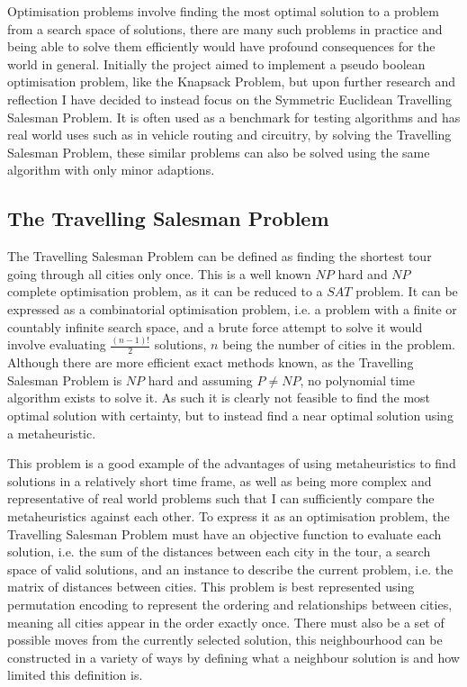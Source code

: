 \documentclass[]{final_report}
\begin{document}
Optimisation problems involve finding the most optimal solution to a problem from a search space of solutions, there are many such problems in practice and being able to solve them efficiently would have profound consequences for the world in general. Initially the project aimed to implement a pseudo boolean optimisation problem, like the Knapsack Problem, but upon further research and reflection I have decided to instead focus on the Symmetric Euclidean Travelling Salesman Problem. It is often used as a benchmark for testing algorithms and has real world uses such as in vehicle routing and circuitry, by solving the Travelling Salesman Problem, these similar problems can also be solved using the same algorithm with only minor adaptions.

\subsection*{The Travelling Salesman Problem}

The Travelling Salesman Problem can be defined as finding the shortest tour going through all cities only once. This is a well known $NP$ hard and $NP$ complete optimisation problem, as it can be reduced to a $SAT$ problem\cite{barak:2007}. It can be expressed as a combinatorial optimisation problem, i.e. a problem with a finite or countably infinite search space, and a brute force attempt to solve it would involve evaluating $\frac{(n - 1)!}{2}$ solutions, $n$ being the number of cities in the problem. Although there are more efficient exact methods known, as the Travelling Salesman Problem is $NP$ hard and assuming $P \neq NP$, no polynomial time algorithm exists to solve it\cite{blum:2001}. As such it is clearly not feasible to find the most optimal solution with certainty, but to instead find a near optimal solution using a metaheuristic.

This problem is a good example of the advantages of using metaheuristics to find solutions in a relatively short time frame, as well as being more complex and representative of real world problems such that I can sufficiently compare the metaheuristics against each other. To express it as an optimisation problem, the Travelling Salesman Problem must have an objective function to evaluate each solution, i.e. the sum of the distances between each city in the tour, a search space of valid solutions, and an instance to describe the current problem, i.e. the matrix of distances between cities. This problem is best represented using permutation encoding to represent the ordering and relationships between cities, meaning all cities appear in the order exactly once. There must also be a set of possible moves from the currently selected solution, this neighbourhood can be constructed in a variety of ways by defining what a neighbour solution is and how limited this definition is.
\end{document}
